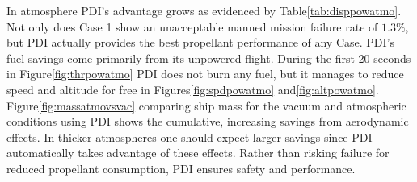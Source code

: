 In atmosphere PDI's advantage grows as evidenced by Table\:\ref{tab:disppowatmo}. Not only does Case 1 show an unacceptable manned mission failure rate of $1.3\%$, but PDI actually provides the best propellant performance of any Case. PDI's fuel savings come primarily from its unpowered flight. During the first 20 seconds in Figure\:\ref{fig:thrpowatmo} PDI does not burn any fuel, but it manages to reduce speed and altitude for free in Figures\:\ref{fig:spdpowatmo} and\:\ref{fig:altpowatmo}. Figure\:\ref{fig:massatmovsvac} comparing ship mass for the vacuum and atmospheric conditions using PDI shows the cumulative, increasing savings from aerodynamic effects.  In thicker atmospheres one should expect larger savings since PDI automatically takes advantage of these effects. Rather than risking failure for reduced propellant consumption, PDI ensures safety and performance.



%
%
%
%
%
%
%
%
%
%
%

